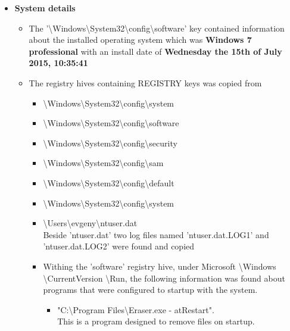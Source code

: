 \begin{enumerate}
\begin{itemize}
	\newpage
	\item \textbf{System details}
	\begin{itemize}
		\item The {\footnotesize '\textbackslash Windows\textbackslash System32\textbackslash config\textbackslash software'} key contained information about the installed operating system which was
		\textbf{Windows 7 professional} with an install date of \textbf{Wednesday the 15th of July 2015, 10:35:41}

		\item The registry hives containing REGISTRY keys was copied from 
		\begin{itemize}
			\item \textbackslash Windows\textbackslash System32\textbackslash config\textbackslash system\\ 
			\item \textbackslash Windows\textbackslash System32\textbackslash config\textbackslash software\\
			\item \textbackslash Windows\textbackslash System32\textbackslash config\textbackslash security\\
			\item \textbackslash Windows\textbackslash System32\textbackslash config\textbackslash sam \\
			\item \textbackslash Windows\textbackslash System32\textbackslash config\textbackslash default \\
			\item \textbackslash Windows\textbackslash System32\textbackslash config\textbackslash system \\
			\item \textbackslash Users\textbackslash evgeny\textbackslash ntuser.dat \\
			Beside 'ntuser.dat' two log files named 'ntuser.dat.LOG1' and 'ntuser.dat.LOG2' were found and copied
			
			\item Withing the 'software' registry hive, under 
			Microsoft \textbackslash Windows \textbackslash CurrentVersion \textbackslash Run, the following information was found about programs that were configured to startup with the system.
			
			\begin{itemize}
				\item "C:\textbackslash Program Files\textbackslash Eraser.exe - atRestart".\\ 
				This is a program designed to remove files on startup.
			\end{itemize}
			

\end{itemize}
\end{itemize}
\end{itemize}
\end{enumerate}
